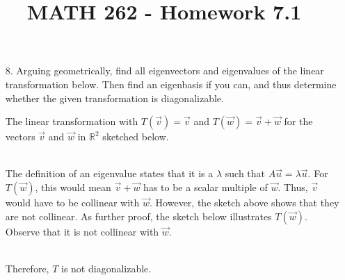 \documentclass[letterpaper,12pt]{article}
\author{}
\title{MATH 262 - Homework 7.1}
\date{} %
\begin{document}
\maketitle

\begin{enumerate}
  \item[8.]
    Arguing geometrically, find all eigenvectors and eigenvalues of the linear transformation below. Then find an eigenbasis if you can, and thus determine whether the given transformation is diagonalizable.
    \begin{center}
      The linear transformation with $T(\vec{v}) = \vec{v}$ and $T(\vec{w}) = \vec{v} + \vec{w}$ for the vectors $\vec{v}$ and $\vec{w}$ in $\mathbb{R}^2$ sketched below.
    \end{center}
     \\
    The definition of an eigenvalue states that it is a $\lambda$ such that $A\vec{u} = \lambda\vec{u}$. For $T(\vec{w})$, this would mean $\vec{v} + \vec{w}$ has to be a scalar multiple of $\vec{w}$. Thus, $\vec{v}$ would have to be collinear with $\vec{w}$. However, the sketch above shows that they are not collinear. As further proof, the sketch below illustrates $T(\vec{w})$. Observe that it is not collinear with $\vec{w}$. \\
     \\
    Therefore, $T$ is not diagonalizable.
\end{enumerate}
\end{document}
